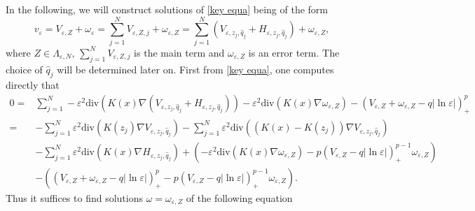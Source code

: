 \documentclass[12pt,reqno]{amsart}
\numberwithin{equation}{section}
\theoremstyle{definition}
\theoremstyle{remark}
\begin{document}
In the following, we will construct solutions of \eqref{key equa} being of the form
\begin{equation}\label{solu config}
v_\varepsilon= V_{\varepsilon, Z}+\omega_\varepsilon=\sum_{j=1}^NV_{\varepsilon, Z,j}+\omega_{\varepsilon,Z}=\sum_{j=1}^N\left (V_{\varepsilon, z_j, \hat{q}_j}+H_{\varepsilon, z_j, \hat{q}_j}\right )+\omega_{\varepsilon,Z},
\end{equation}
where $ Z\in \Lambda_{\varepsilon, N} $, $ \sum_{j=1}^NV_{\varepsilon, Z,j} $ is the main term and $ \omega_{\varepsilon,Z}$ is an error term. The choice of $ \hat{q}_j $ will be determined later on. First from \eqref{key equa}, one computes directly that
\begin{equation*}
\begin{split}
0=&\sum_{j=1}^N-\varepsilon^2\text{div}(K(x)\nabla (V_{\varepsilon, z_j, \hat{q}_j}+H_{\varepsilon, z_j, \hat{q}_j}))-\varepsilon^2\text{div}(K(x)\nabla \omega_{\varepsilon,Z})-\left (V_{\varepsilon, Z}+\omega_{\varepsilon,Z}-q|\ln\varepsilon|\right )^{p}_+\\
=&-\sum_{j=1}^N\varepsilon^2\text{div}(K(z_j)\nabla V_{\varepsilon, z_j, \hat{q}_j})-\sum_{j=1}^N\varepsilon^2\text{div}((K(x)-K(z_j))\nabla V_{\varepsilon, z_j, \hat{q}_j})\\
&-\sum_{j=1}^N\varepsilon^2\text{div}(K(x)\nabla H_{\varepsilon, z_j, \hat{q}_j})+\left (-\varepsilon^2\text{div}(K(x)\nabla \omega_{\varepsilon,Z})-p\left ( V_{\varepsilon, Z}-q|\ln\varepsilon|\right )^{p-1}_+\omega_{\varepsilon,Z} \right )\\
&-\left (\left (V_{\varepsilon, Z}+\omega_{\varepsilon,Z}-q|\ln\varepsilon|\right )^{p}_+-p\left (V_{\varepsilon, Z}-q|\ln\varepsilon|\right )^{p-1}_+\omega_{\varepsilon,Z}\right ).
\end{split}
\end{equation*}
Thus it suffices to find solutions  $ \omega=\omega_{\varepsilon,Z} $ of the following equation 
\end{document}
